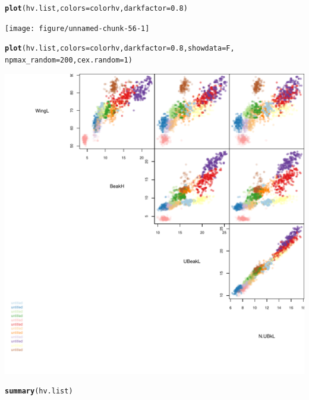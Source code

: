 \documentclass[12pt]{article}\usepackage[]{graphicx}\usepackage[]{color}
\makeatletter
\def\maxwidth{ %
  \ifdim\Gin@nat@width>\linewidth
    \linewidth
  \else
    \Gin@nat@width
  \fi
}
\newcommand{\hlnum}[1]{\textcolor[rgb]{0.686,0.059,0.569}{#1}}%
\newcommand{\hlstd}[1]{\textcolor[rgb]{0.345,0.345,0.345}{#1}}%
\newcommand{\hlkwc}[1]{\textcolor[rgb]{0.333,0.667,0.333}{#1}}%
\newcommand{\hlkwd}[1]{\textcolor[rgb]{0.737,0.353,0.396}{\textbf{#1}}}%
\newenvironment{kframe}{%
 \def\at@end@of@kframe{}%
 \ifinner\ifhmode%
  \def\at@end@of@kframe{\end{minipage}}%
  \begin{minipage}{\columnwidth}%
 \fi\fi%
 \def\FrameCommand##1{\hskip\@totalleftmargin \hskip-\fboxsep
 \colorbox{shadecolor}{##1}\hskip-\fboxsep
     \hskip-\linewidth \hskip-\@totalleftmargin \hskip\columnwidth}%
 \MakeFramed {\advance\hsize-\width
   \@totalleftmargin\z@ \linewidth\hsize
   \@setminipage}}%
 {\par\unskip\endMakeFramed%
 \at@end@of@kframe}
\newenvironment{knitrout}{}{} %
\makeatother
\begin{document}
\begin{knitrout}
\begin{kframe}
\begin{alltt}
\hlkwd{plot}\hlstd{(hv.list,} \hlkwc{colors} \hlstd{= colorhv,} \hlkwc{darkfactor} \hlstd{=} \hlnum{0.8}\hlstd{)}
\end{alltt}
\end{kframe}
\texttt{[image: figure/unnamed-chunk-56-1]} 
\begin{kframe}\begin{alltt}
\hlkwd{plot}\hlstd{(hv.list,} \hlkwc{colors} \hlstd{= colorhv,} \hlkwc{darkfactor} \hlstd{=} \hlnum{0.8}\hlstd{,} \hlkwc{showdata} \hlstd{= F,}
     \hlkwc{npmax_random} \hlstd{=} \hlnum{200}\hlstd{,} \hlkwc{cex.random} \hlstd{=} \hlnum{1}\hlstd{)}
\end{alltt}
\end{kframe}
\includegraphics[width=\maxwidth]{figure/unnamed-chunk-56-2} 

\end{knitrout}

\begin{knitrout}
\color{fgcolor}\begin{kframe}
\begin{alltt}
\hlkwd{summary}\hlstd{(hv.list)}
\end{alltt}
\end{kframe}
\end{knitrout}
\end{document}
